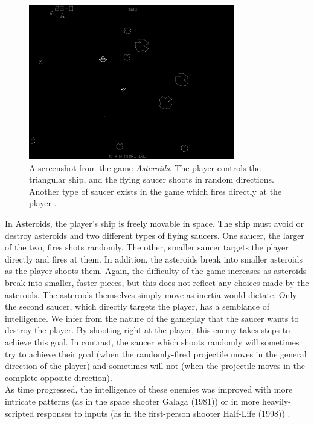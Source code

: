 \begin{figure}[H]
  \centering
  \includegraphics[width=9cm]{figures/Asteroids.png}
  \caption{A screenshot from the game \textit{Asteroids}. The player controls the triangular ship, and the flying saucer shoots in random directions. Another type of saucer exists in the game which fires directly at the player \cite{asteroids79}.}
  \label{fig:Asteroids}
\end{figure}

In Asteroids, the player's ship is freely movable in space. The ship must avoid or destroy asteroids and two different types of flying saucers. One saucer, the larger of the two, fires shots randomly. The other, smaller saucer targets the player directly and fires at them. In addition, the asteroids break into smaller asteroids as the player shoots them. Again, the difficulty of the game increases as asteroids break into smaller, faster pieces, but this does not reflect any choices made by the asteroids. The asteroids themselves simply move as inertia would dictate. Only the second saucer, which directly targets the player, has a semblance of intelligence. We infer from the nature of the gameplay that the saucer wants to destroy the player. By shooting right at the player, this enemy takes steps to achieve this goal. In contrast, the saucer which shoots randomly will sometimes try to achieve their goal (when the randomly-fired projectile moves in the general direction of the player) and sometimes will not (when the projectile moves in the complete opposite direction).\\

As time progressed, the intelligence of these enemies was improved with more intricate patterns (as in the space shooter Galaga (1981)) or in more heavily-scripted responses to inputs (as in the first-person shooter Half-Life (1998)) \cite{schw04}.

